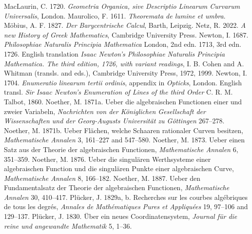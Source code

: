 \newline\indent  MacLaurin, C. 1720.  \emph{Geometria Organica, sive Descriptio Linearum Curvarum Universalis}, London.
 \newline\indent Maurolico, F. 1611. \emph{Theoremata de lumine et umbra}. 
 \newline\indent M\"obius, A. F. 1827. \emph{Der Barycentrische Calcul}, Barth, Leipzig.
 \newline\indent  Netz, R. 2022. \emph{A new History of Greek Mathematics}, Cambridge University Press.
\newline\indent Newton, I. 1687. \emph{Philosophiae  Naturalis Principia Mathematica} London, 2nd edn. 1713, 3rd edn. 1726. English translation \emph{Isaac Newton's Philosophiae Naturalis Principia Mathematica. The third edition, 1726, with variant readings}, I. B. Cohen and A. Whitman (transls. and eds.), Cambridge University Press, 1972, 1999.
\newline\indent Newton, I. 1704. \emph{Enumeratio linearum tertii ordinis}, appendix in \emph{Opticks}, London. English transl. \emph{Sir Isaac Newton's Enumeration of Lines of the third Order} C. R. M. Talbot, 1860.
\newline\indent Noether, M. 1871a. Ueber die algebraischen Functionen einer und zweier Variabeln, \emph{Nachrichten von der K\"oniglichen Gesellschaft der Wissenschaften und der Georg-Au\-gusts Universit\"at zu G\"ottingen} 267--278.
\newline\indent Noether, M. 1871b. Ueber Fl\"achen, welche Schaaren rationaler Curven besitzen, \emph{Mathematische  Annalen} 3,   161--227 and 547--580.
\newline\indent Noether, M. 1873. Ueber einen Satz aus der Theorie der algebraischen Functionen, \emph{Mathematische Annalen} 6, 351--359.
\newline\indent Noether, M. 1876.  Ueber die singul\"aren Werthsysteme einer algebraischen Function und die singul\"aren Punkte einer algebraischen Curve, \emph{Mathematische  Annalen} 8, 166--182.
\newline\indent Noether, M. 1887. Ueber den Fundamentalsatz der Theorie der
algebraischen Functionen,  \emph{Mathematische Annalen} 30, 410--417. 
\newline\indent Pl\"ucker, J. 1829a, b. Recherches sur les courbes alg\'ebriques de tous les degr\'es, \emph{Annales de Math\'e\-matiques Pures et Appliqu\'ees} 19, 97--106 and 129--137.
\newline\indent Pl\"ucker, J. 1830. \"Uber ein neues Coordinatensystem, \emph{Journal f\"ur die reine und angewandte Mathematik} 5, 1--36.
